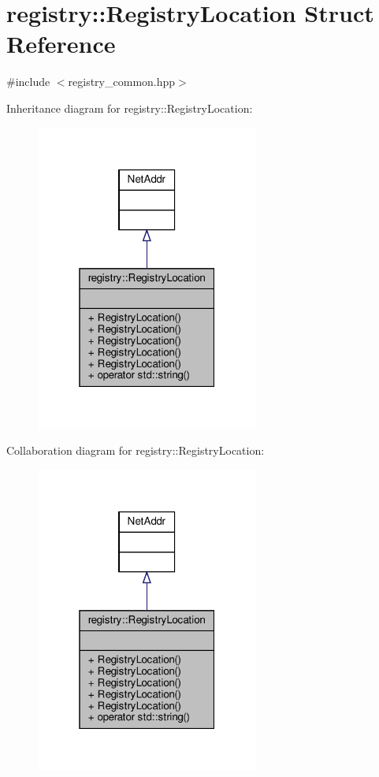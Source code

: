 \hypertarget{structregistry_1_1RegistryLocation}{}\section{registry\+:\+:Registry\+Location Struct Reference}
\label{structregistry_1_1RegistryLocation}


{\ttfamily \#include $<$registry\+\_\+common.\+hpp$>$}



Inheritance diagram for registry\+:\+:Registry\+Location\+:\nopagebreak
\begin{figure}[H]
\begin{center}
\leavevmode
\includegraphics[width=208pt]{structregistry_1_1RegistryLocation__inherit__graph}
\end{center}
\end{figure}


Collaboration diagram for registry\+:\+:Registry\+Location\+:\nopagebreak
\begin{figure}[H]
\begin{center}
\leavevmode
\includegraphics[width=208pt]{structregistry_1_1RegistryLocation__coll__graph}
\end{center}
\end{figure}
